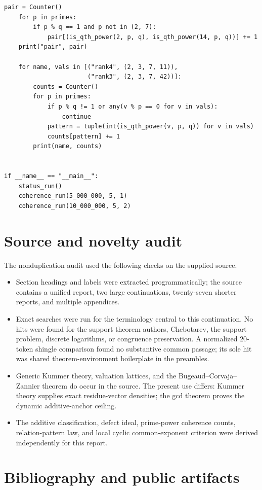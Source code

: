 \documentclass[11pt]{article}
\theoremstyle{definition}
\theoremstyle{remark}
\begin{document}
\begin{lstlisting}[style=pythonstyle]
    pair = Counter()
    for p in primes:
        if p % q == 1 and p not in (2, 7):
            pair[(is_qth_power(2, p, q), is_qth_power(14, p, q))] += 1
    print("pair", pair)

    for name, vals in [("rank4", (2, 3, 7, 11)),
                       ("rank3", (2, 3, 7, 42))]:
        counts = Counter()
        for p in primes:
            if p % q != 1 or any(v % p == 0 for v in vals):
                continue
            pattern = tuple(int(is_qth_power(v, p, q)) for v in vals)
            counts[pattern] += 1
        print(name, counts)


if __name__ == "__main__":
    status_run()
    coherence_run(5_000_000, 5, 1)
    coherence_run(10_000_000, 5, 2)
\end{lstlisting}

\section{Source and novelty audit}

The nonduplication audit used the following checks on the supplied source.
\begin{itemize}[leftmargin=2em]
\item Section headings and labels were extracted programmatically; the source contains a unified
      report, two large continuations, twenty-seven shorter reports, and multiple appendices.
\item Exact searches were run for the terminology central to this continuation.  No hits were
      found for the support theorem authors, Chebotarev, the support problem, discrete logarithms,
      or congruence preservation.  A normalized $20$-token shingle comparison found no substantive
      common passage; its sole hit was shared theorem-environment boilerplate in the preambles.
\item Generic Kummer theory, valuation lattices, and the Bugeaud--Corvaja--Zannier theorem do
      occur in the source.  The present use differs: Kummer theory supplies exact residue-vector
      densities; the gcd theorem proves the dynamic additive-anchor ceiling.
\item The additive classification, defect ideal, prime-power coherence counts, relation-pattern
      law, and local cyclic common-exponent criterion were derived independently for this report.
\end{itemize}

\section{Bibliography and public artifacts}
\end{document}
